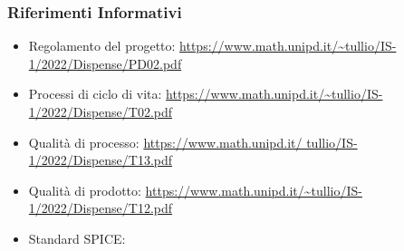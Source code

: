 \subsubsection{Riferimenti Informativi}
\begin{itemize}
    \item Regolamento del progetto: \url{https://www.math.unipd.it/~tullio/IS-1/2022/Dispense/PD02.pdf}
    \item Processi di ciclo di vita: \url{https://www.math.unipd.it/~tullio/IS-1/2022/Dispense/T02.pdf}
    \item Qualità di processo: \url{https://www.math.unipd.it/ tullio/IS-1/2022/Dispense/T13.pdf}
    \item Qualità di prodotto: \url{https://www.math.unipd.it/~tullio/IS-1/2022/Dispense/T12.pdf}
    \item Standard SPICE:
\end{itemize}